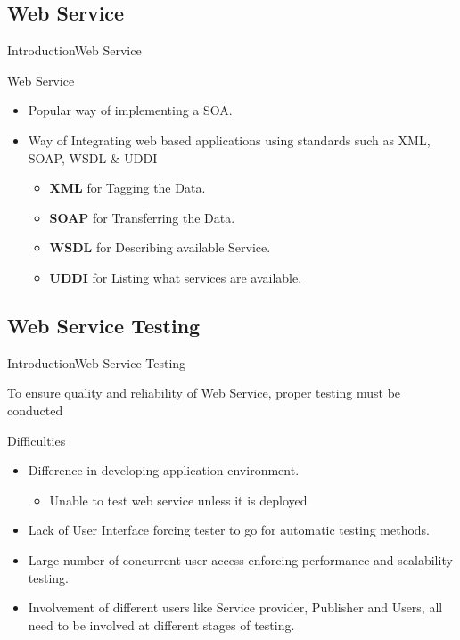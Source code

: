 \documentclass[10pt]{beamer}
\begin{document}
\subsection{Web Service}
\begin{frame}{Introduction}{Web Service}
\begin{block}{Web Service}
\begin{itemize}
\item Popular way of implementing a SOA.
\item Way of Integrating web based applications using standards such as XML, SOAP, WSDL \& UDDI
\begin{itemize}
\item \textbf{XML} for Tagging the Data.
\item \textbf{SOAP} for Transferring the Data.
\item \textbf{WSDL} for Describing available Service.
\item \textbf{UDDI} for Listing what services are available.

\end{itemize}
\end{itemize}
\end{block}
\end{frame}

\subsection{Web Service Testing}
\begin{frame}{Introduction}{Web Service Testing}

  To ensure quality and reliability of Web Service, proper testing  must be conducted
 
  \begin{block}{Difficulties}
  \begin{itemize}   
    \item Difference in developing application environment.
    \begin{itemize}
    \item Unable to test web service unless it is deployed
    \end{itemize}
    \item Lack of User Interface forcing tester to go for automatic testing methods.
    \item Large number of concurrent user access enforcing performance and scalability testing.
    \item Involvement of different users like Service provider, Publisher and Users, all need to be involved at different stages of testing.
  \end{itemize}
  \end{block}

  
\end{frame}
     
\end{document}
